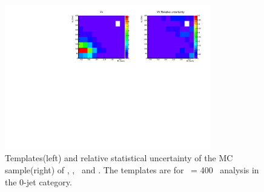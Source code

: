 \begin{figure}[htp]
\includegraphics[width=0.8\textwidth]{figures/2dtemplate_VV_mH400_0j.pdf}
\caption{Templates(left) and relative statistical uncertainty of the MC sample(right) 
of \qqww, \ggww, \topbkg\ and \vv. 
The templates are for \mHi\ = 400 \GeV\ analysis in the 0-jet category.}
\label{fig:2dtemplate_400_0j_2}
\end{figure}

